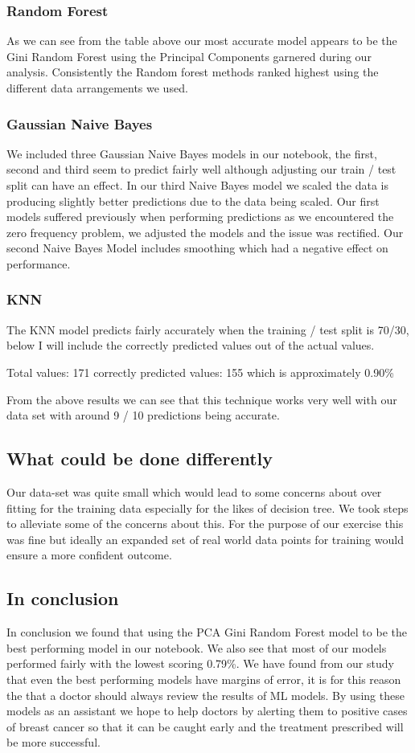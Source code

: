 \documentclass[conference]{IEEEtran}
\begin{document}
\subsubsection{Random Forest}
As we can see from the table above our most accurate model appears to be the Gini Random Forest using the Principal Components garnered during our analysis. Consistently the Random forest methods ranked highest using the different data arrangements we used.
\subsubsection{Gaussian Naive Bayes}
We included three Gaussian Naive Bayes models in our notebook, the first, second and third seem to predict fairly well although adjusting our train / test split can have an effect.  In our third Naive Bayes model we scaled the data is producing slightly better predictions due to the data being scaled.  Our first models suffered previously when performing predictions as we encountered the zero frequency problem, we adjusted the models and the issue was rectified.  Our  second Naive Bayes Model includes smoothing which had a negative effect on performance.
\subsubsection{KNN}
The KNN model predicts fairly accurately when the training / test split is 70/30, below I will include the correctly predicted values out of the actual values.

Total values:  171  correctly predicted values:  155 which is approximately 0.90\%

From the above results we can see that this technique works very well with our data set with around 9 / 10 predictions being accurate. 
\subsection{What could be done differently}
Our data-set was quite small which would lead to some concerns about over fitting for the training data especially for the likes of decision tree. We took steps to alleviate some of the concerns about this. For the purpose of our exercise this was fine but ideally an expanded set of real world data points for training would ensure a more confident outcome.
\subsection{In conclusion}
In conclusion we found that using the PCA Gini Random Forest model to be the best performing model in our notebook.  We also see that most of our models performed fairly with the lowest scoring 0.79\%.  We have found from our study that even the best performing models have margins of error, it is for this reason the that a doctor should always review the results of ML models.  By using these models as an assistant we hope to help doctors by alerting them to positive cases of breast cancer so that it can be caught early and the treatment prescribed will be more successful.
\newpage
\clearpage
\tableofcontents
\printbibliography
\listoffigures
\end{document}
